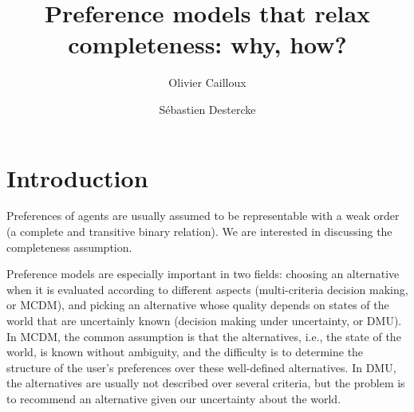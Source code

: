 \documentclass[french, english]{llncs}
\begin{document}
	\title{Preference models that relax completeness: why, how?}
	\author{Olivier Cailloux \and Sébastien Destercke}
	\maketitle
	
	
	\setlength{\parindent}{1.5em}
	
	\section{Introduction}\label{sec:intro}
	Preferences of agents are usually assumed to be representable with a weak order (a complete and transitive binary relation). We are interested in discussing the completeness assumption. 
	
	Preference models are especially important in two fields: choosing an alternative when it is evaluated according to different aspects (multi-criteria decision making, or MCDM), and picking an alternative whose quality depends on states of the world that are uncertainly known (decision making under uncertainty, or DMU).
	In MCDM, the common assumption is that the alternatives, i.e., the state of the world, is known without ambiguity, and the difficulty is to determine the structure of the user’s preferences over these well-defined alternatives. In DMU, the alternatives are usually not described over several criteria, but the problem is to recommend an alternative given our uncertainty about the world. 
	
\end{document}
